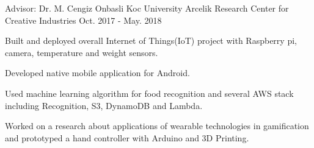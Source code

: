 \begin{cventries}
  \cvopenentry
    {Advisor: Dr. M. Cengiz Onbasli} %
    {Koc University Arcelik Research Center for Creative Industries} %
    {}
    {Oct. 2017 - May. 2018} %
    {
      \begin{cvitems} %
        \item {Built and deployed overall Internet of Things(IoT) project with Raspberry pi, camera, temperature and weight sensors.  }
        \item {Developed native mobile application for Android. }
       	\item {Used machine learning algorithm for food recognition and several AWS stack including Recognition, S3, DynamoDB and Lambda.} 
         \item {Worked on a research about applications  of wearable technologies in gamification and prototyped a hand controller with Arduino and 3D Printing.}
      \end{cvitems}
    }


\end{cventries}
